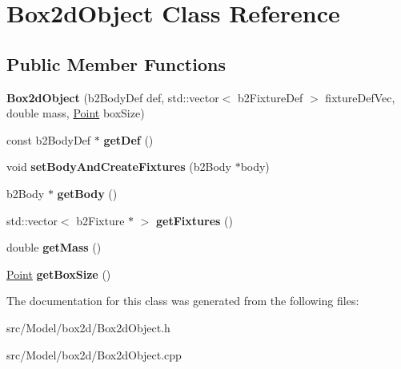 \hypertarget{classBox2dObject}{}\section{Box2d\+Object Class Reference}
\label{classBox2dObject}
\subsection*{Public Member Functions}
\begin{DoxyCompactItemize}
\item 
{\bfseries Box2d\+Object} (b2\+Body\+Def def, std\+::vector$<$ b2\+Fixture\+Def $>$ fixture\+Def\+Vec, double mass, \hyperlink{classPoint}{Point} box\+Size)\hypertarget{classBox2dObject_ac710f47a1f53fea5e7e8328e1db48969}{}\label{classBox2dObject_ac710f47a1f53fea5e7e8328e1db48969}

\item 
const b2\+Body\+Def $\ast$ {\bfseries get\+Def} ()\hypertarget{classBox2dObject_ab4eee398bdfc614e2610f5e659dca9f5}{}\label{classBox2dObject_ab4eee398bdfc614e2610f5e659dca9f5}

\item 
void {\bfseries set\+Body\+And\+Create\+Fixtures} (b2\+Body $\ast$body)\hypertarget{classBox2dObject_aa8d38b6de3d0c7b389b28a59e68aec24}{}\label{classBox2dObject_aa8d38b6de3d0c7b389b28a59e68aec24}

\item 
b2\+Body $\ast$ {\bfseries get\+Body} ()\hypertarget{classBox2dObject_af91c5d9ad12a410549b4b271e78d3080}{}\label{classBox2dObject_af91c5d9ad12a410549b4b271e78d3080}

\item 
std\+::vector$<$ b2\+Fixture $\ast$ $>$ {\bfseries get\+Fixtures} ()\hypertarget{classBox2dObject_ab9143129c22eddc6181d3b61e1b6760c}{}\label{classBox2dObject_ab9143129c22eddc6181d3b61e1b6760c}

\item 
double {\bfseries get\+Mass} ()\hypertarget{classBox2dObject_a799708a749a48b323132417d61badbce}{}\label{classBox2dObject_a799708a749a48b323132417d61badbce}

\item 
\hyperlink{classPoint}{Point} {\bfseries get\+Box\+Size} ()\hypertarget{classBox2dObject_ab141066294257405dd26a8d1515b0ff8}{}\label{classBox2dObject_ab141066294257405dd26a8d1515b0ff8}

\end{DoxyCompactItemize}


The documentation for this class was generated from the following files\+:\begin{DoxyCompactItemize}
\item 
src/\+Model/box2d/Box2d\+Object.\+h\item 
src/\+Model/box2d/Box2d\+Object.\+cpp\end{DoxyCompactItemize}
